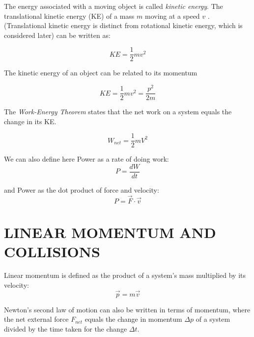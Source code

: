 \documentclass[12pt, letterpaper, twoside]{article}
\begin{document}
\bigskip

The energy associated with a moving object is called \emph{kinetic energy}.  The translational kinetic energy (KE) of a mass  $m$  moving at a speed  $v$ . (Translational kinetic energy is distinct from rotational kinetic energy, which is considered later) can be written as:

\begin{equation}
KE = \frac{1}{2} m v^2
\end{equation}

\bigskip 


The kinetic energy of an object can be related to its momentum


\begin{equation}
KE = \frac{1}{2} m v^2 = \frac{p^2}{2m}
\end{equation}

\bigskip


The \emph{Work-Energy Theorem} states that the net work on a system equals the change in its KE.

\begin{equation}
W_{net} = \frac{1}{2}m V^2
\end{equation}

\bigskip

We can also define here Power as a rate of doing work:
\begin{equation}
P = \frac{dW}{dt}
\end{equation}
\bigskip

and Power as the dot product of force and velocity:
\begin{equation}
P = \overrightarrow{F} \cdot \overrightarrow{v} 
\end{equation}


\newpage


\section{LINEAR MOMENTUM AND COLLISIONS}

\bigskip


Linear momentum is defined as the product of a system’s mass multiplied by its velocity:
\begin{equation}
\overrightarrow{p} = m \overrightarrow{v}
\end{equation}

\bigskip
Newton's second law of motion can also be written in terms of momentum, where the net external force $F_{net}$ equals the change in momentum $\Delta p$ of a system divided by the time taken for the change $\Delta t$.
\end{document}
